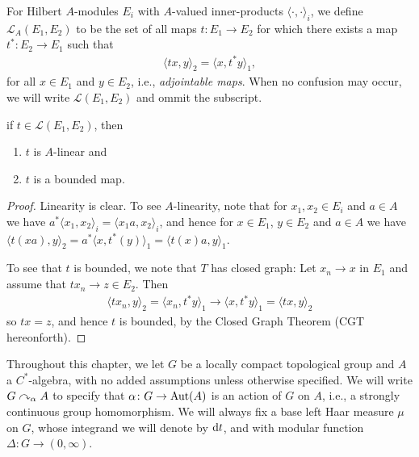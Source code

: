 \begin{definition}
	For Hilbert $A$-modules $E_i$ with $A$-valued inner-products $\langle \cdot , \cdot\rangle_i$, we define $\mathcal{L}_A(E_1,E_2)$ to be the set of all maps $t \colon E_1 \to E_2$ for which there exists a map $t^* \colon E_2 \to E_1$ such that
	\begin{align*}
		\langle tx, y \rangle_2 = \langle x , t^*y \rangle_1,
	\end{align*}
	for all $x \in E_1$ and $y \in E_2$, i.e., \emph{adjointable maps}. When no confusion may occur, we will write $\mathcal{L}(E_1,E_2)$ and ommit the subscript.
\end{definition}
\begin{proposition}
	if $t \in \mathcal{L}(E_1,E_2)$, then
\begin{enumerate}
	\item $t$ is $A$-linear and\\
	\item $t$ is a bounded map.
\end{enumerate}
\end{proposition}
\begin{proof}
	Linearity is clear. To see $A$-linearity, note that for $x_1,x_2 \in E_i$ and $a \in A$ we have $a^* \langle x_1,x_2\rangle_i = \langle x_1 a , x_2\rangle_i$, and hence for $x \in E_1$, $y \in E_2$ and $a \in A$ we have $\langle t(xa) , y \rangle_2 = a^* \langle x,t^*(y)\rangle_1 = \langle t(x)a,y\rangle_1$.

	To see that $t$ is bounded, we note that $T$ has closed graph: Let $x_n \to x$ in $E_1$ and assume that $tx_n \to z \in E_2$. Then
	\begin{align*}
		\langle tx_n , y\rangle_2  = \langle x_n, t^*y\rangle_1 \to \langle x, t^*y \rangle_1 = \langle tx,y\rangle_2
	\end{align*}
	so $tx = z$, and hence $t$ is bounded, by the Closed Graph Theorem (CGT hereonforth).
\end{proof}











Throughout this chapter, we let $G$ be a locally compact topological group and $A$ a $C^*$-algebra, with no added assumptions unless otherwise specified. We will write $G \curvearrowright_\alpha A$ to specify that $\alpha \colon G \to \operatorname{Aut}(A)$ is an action of $G$ on $A$, i.e., a strongly continuous group homomorphism. We will always fix a base left Haar measure $\mu$ on $G$, whose integrand we will denote by $\mathrm{d} t$, and with modular function $\Delta \colon G \to (0,\infty)$.

